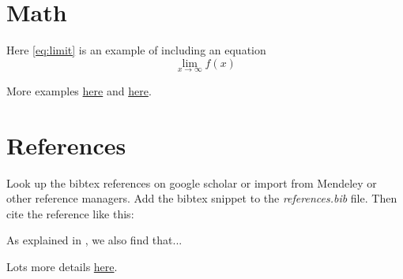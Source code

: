 \section{Math}
Here \ref{eq:limit} is an example of including an equation
\begin{equation}
  \lim_{x\to\infty} f(x)
  \label{eq:limit}
\end{equation}

More examples \href{https://www.latex-tutorial.com/tutorials/amsmath/}{here} and \href{https://www.overleaf.com/learn/latex/Mathematical_expressions}{here}.



\section{References}
Look up the bibtex references on google scholar or import from Mendeley or other reference managers. Add the bibtex snippet to the \emph{references.bib} file. Then cite the reference like this:

As explained in \cite{knuth2014art}, we also find that...

Lots more details \href{https://www.latex-tutorial.com/tutorials/bibtex/}{here}.
